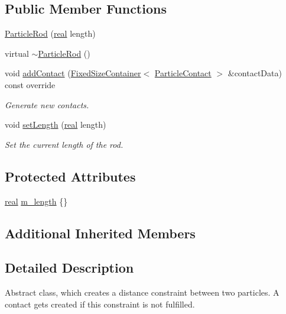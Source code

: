 \subsection*{Public Member Functions}
\begin{DoxyCompactItemize}
\item 
\mbox{\hyperlink{classr3_1_1_particle_rod_a1bb04a9a962ed22132ad3e954eec6609}{Particle\+Rod}} (\mbox{\hyperlink{namespacer3_ab2016b3e3f743fb735afce242f0dc1eb}{real}} length)
\item 
virtual \mbox{\hyperlink{classr3_1_1_particle_rod_aa6fd377f7694d3d64ef4135e6bd4299e}{$\sim$\+Particle\+Rod}} ()
\item 
void \mbox{\hyperlink{classr3_1_1_particle_rod_a6e76b20d315514a2ce7ef0b40154f0df}{add\+Contact}} (\mbox{\hyperlink{classr3_1_1_fixed_size_container}{Fixed\+Size\+Container}}$<$ \mbox{\hyperlink{classr3_1_1_particle_contact}{Particle\+Contact}} $>$ \&contact\+Data) const override
\begin{DoxyCompactList}\small\item\em Generate new contacts. \end{DoxyCompactList}\item 
void \mbox{\hyperlink{classr3_1_1_particle_rod_af81456ae2749d12bf7fa7bf265fc4c23}{set\+Length}} (\mbox{\hyperlink{namespacer3_ab2016b3e3f743fb735afce242f0dc1eb}{real}} length)
\begin{DoxyCompactList}\small\item\em Set the current length of the rod. \end{DoxyCompactList}\end{DoxyCompactItemize}
\subsection*{Protected Attributes}
\begin{DoxyCompactItemize}
\item 
\mbox{\hyperlink{namespacer3_ab2016b3e3f743fb735afce242f0dc1eb}{real}} \mbox{\hyperlink{classr3_1_1_particle_rod_af146e442c0ddcb83161f115da58fa026}{m\+\_\+length}} \{\}
\end{DoxyCompactItemize}
\subsection*{Additional Inherited Members}


\subsection{Detailed Description}
Abstract class, which creates a distance constraint between two particles. A contact gets created if this constraint is not fulfilled. 

